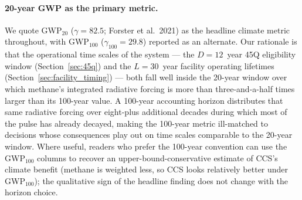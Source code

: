 \documentclass[11pt]{article}
\begin{document}
\paragraph{20-year GWP as the primary metric.} We quote GWP$_{20}$ ($\gamma = 82.5$; Forster et al.\ 2021) as the headline climate metric throughout, with GWP$_{100}$ ($\gamma_{100} = 29.8$) reported as an alternate. Our rationale is that the operational time scales of the system --- the $D = 12$~year 45Q eligibility window (Section~\ref{sec:45q}) and the $L = 30$~year facility operating lifetimes (Section~\ref{sec:facility_timing}) --- both fall well inside the 20-year window over which methane's integrated radiative forcing is more than three-and-a-half times larger than its 100-year value. A 100-year accounting horizon distributes that same radiative forcing over eight-plus additional decades during which most of the pulse has already decayed, making the 100-year metric ill-matched to decisions whose consequences play out on time scales comparable to the 20-year window. Where useful, readers who prefer the 100-year convention can use the GWP$_{100}$ columns to recover an upper-bound-conservative estimate of CCS's climate benefit (methane is weighted less, so CCS looks relatively better under GWP$_{100}$); the qualitative sign of the headline finding does not change with the horizon choice.
\end{document}
